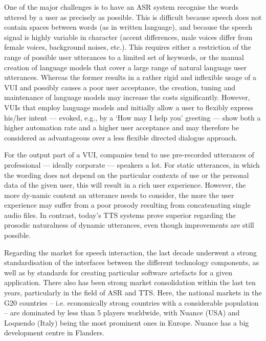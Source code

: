 \documentclass{scrartcl}
\begin{document}
\begin{Parallel}[c]{70mm}{70mm}
{    One of the major challenges is to have an ASR system recognise the words uttered by a user as precisely as possible. This is difficult because speech does not contain spaces between words (as in written language), and because the speech signal is highly variable in character (accent differences, male voices differ from female voices, background noises, etc.).  This requires either a restriction of the range of possible user utterances to a limited set of keywords, or the manual creation of language models that cover a large range of natural language user utterances. Whereas the former results in a rather rigid and inflexible usage of a VUI and possibly causes a poor user acceptance, the creation, tuning and maintenance of language models may increase the costs significantly. However, VUIs that employ language models and initially allow a user to flexibly express his/her intent --- evoked, e.g., by a `How may I help you' greeting --- show both a higher automation rate and a higher user acceptance and may therefore be considered as advantageous over a less flexible directed dialogue approach.

    For the output part of a VUI, companies tend to use pre-recorded utterances of professional --- ideally corporate --- speakers a lot. For static utterances, in which the wording does not depend on the particular contexts of use or the personal data of the given user, this will result in a rich user experience. However, the more dy-namic content an utterance needs to consider, the more the user experience may suffer from a poor prosody resulting from concatenating single audio files. In contrast, today's TTS systems prove superior regarding the prosodic naturalness of dynamic utterances, even though improvements are still possible.

    Regarding the market for speech interaction, the last decade underwent a strong standardisation of the interfaces between the different technology components, as well as by standards for creating particular software artefacts for a given application. There also has been strong market consolidation within the last ten years, particularly in the field of ASR and TTS. Here, the national markets in the G20 countries -- i.e. economically strong countries with a considerable population -- are dominated by less than 5 players worldwide, with Nuance (USA) and Loquendo (Italy) being the most prominent ones in Europe. Nuance has a big development centre in Flanders.

 

  }


\end{Parallel}
\end{document}
